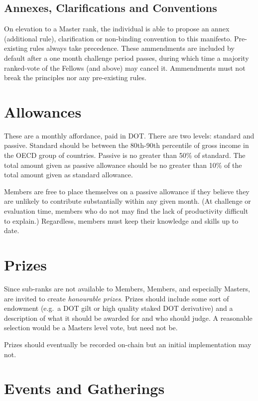 \documentclass[9pt,oneside]{amsart}
\begin{document}
\subsection{Annexes, Clarifications and Conventions}\label{annexes-clarifications-and-conventions}

On elevation to a Master rank, the individual is able to propose an annex (additional rule), clarification or non-binding convention to this manifesto. Pre-existing rules always take precedence. These ammendments are included by default after a one month challenge period passes, during which time a majority ranked-vote of the Fellows (and above) may cancel it. Ammendments must not break the principles nor any pre-existing rules.

\section{Allowances}\label{allowances}

These are a monthly affordance, paid in DOT. There are two levels: standard and passive. Standard should be between the 80th-90th percentile of gross income in the OECD group of countries. Passive is no greater than 50\% of standard. The total amount given as passive allowance should be no greater than 10\% of the total amount given as standard allowance.

Members are free to place themselves on a passive allowance if they believe they are unlikely to contribute substantially within any given month. (At challenge or evaluation time, members who do not may find the lack of productivity difficult to explain.) Regardless, members must keep their knowledge and skills up to date.

\section{Prizes}\label{prizes}

Since sub-ranks are not available to Members, Members, and especially Masters, are invited to create \emph{honourable prizes}. Prizes should include some sort of endowment (e.g.~a DOT gilt or high quality staked DOT derivative) and a description of what it should be awarded for and who should judge. A reasonable selection would be a Masters level vote, but need not be.

Prizes should eventually be recorded on-chain but an initial implementation may not.

\section{Events and Gatherings}\label{events-and-gatherings}
\end{document}
